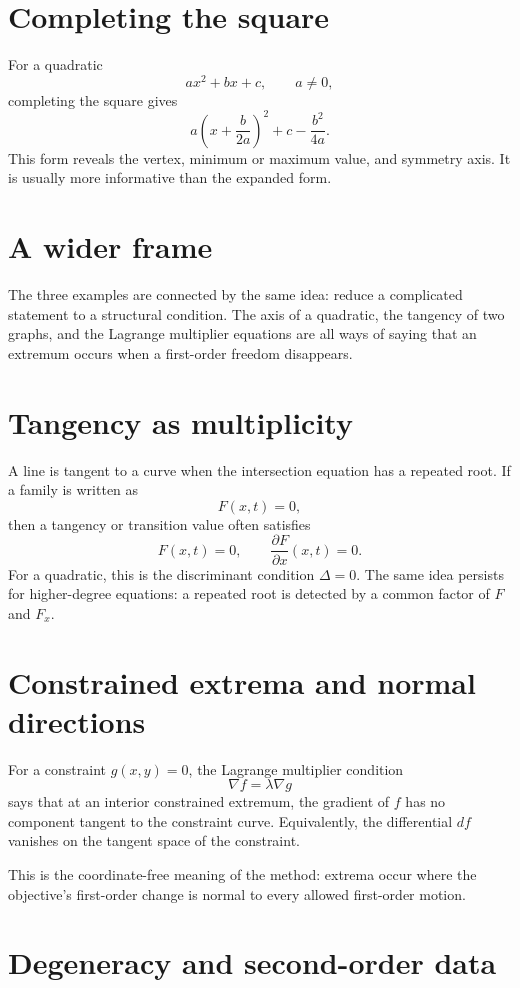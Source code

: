 \section{Completing the square}

For a quadratic
\[
  ax^2+bx+c,\qquad a\ne0,
\]
completing the square gives
\[
  a\left(x+\frac b{2a}\right)^2+c-\frac{b^2}{4a}.
\]
This form reveals the vertex, minimum or maximum value, and symmetry axis.  It is usually more informative than the expanded form.

\section{A wider frame}

The three examples are connected by the same idea: reduce a complicated statement to a structural condition.  The axis of a quadratic, the tangency of two graphs, and the Lagrange multiplier equations are all ways of saying that an extremum occurs when a first-order freedom disappears.

\section{Tangency as multiplicity}

A line is tangent to a curve when the intersection equation has a repeated root.  If a family is written as
\[
  F(x,t)=0,
\]
then a tangency or transition value often satisfies
\[
  F(x,t)=0,\qquad \frac{\partial F}{\partial x}(x,t)=0.
\]
For a quadratic, this is the discriminant condition \(\Delta=0\).  The same idea persists for higher-degree equations: a repeated root is detected by a common factor of \(F\) and \(F_x\).

\section{Constrained extrema and normal directions}

For a constraint \(g(x,y)=0\), the Lagrange multiplier condition
\[
  \nabla f=\lambda \nabla g
\]
says that at an interior constrained extremum, the gradient of \(f\) has no component tangent to the constraint curve.  Equivalently, the differential \(df\) vanishes on the tangent space of the constraint.

This is the coordinate-free meaning of the method: extrema occur where the objective's first-order change is normal to every allowed first-order motion.

\section{Degeneracy and second-order data}

